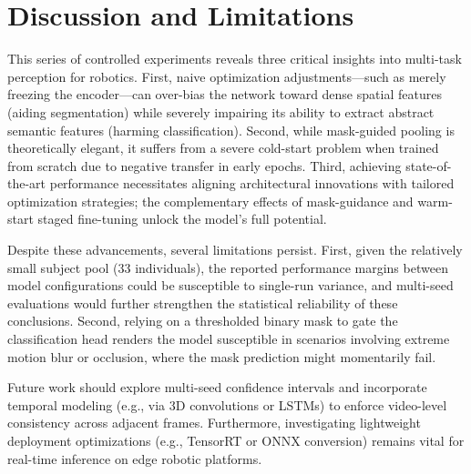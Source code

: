 \documentclass[conference]{IEEEtran}
\begin{document}
\section{Discussion and Limitations}
This series of controlled experiments reveals three critical insights into multi-task perception for robotics. First, naive optimization adjustments—such as merely freezing the encoder—can over-bias the network toward dense spatial features (aiding segmentation) while severely impairing its ability to extract abstract semantic features (harming classification). Second, while mask-guided pooling is theoretically elegant, it suffers from a severe cold-start problem when trained from scratch due to negative transfer in early epochs. Third, achieving state-of-the-art performance necessitates aligning architectural innovations with tailored optimization strategies; the complementary effects of mask-guidance and warm-start staged fine-tuning unlock the model's full potential.

Despite these advancements, several limitations persist. First, given the relatively small subject pool (33 individuals), the reported performance margins between model configurations could be susceptible to single-run variance, and multi-seed evaluations would further strengthen the statistical reliability of these conclusions. Second, relying on a thresholded binary mask to gate the classification head renders the model susceptible in scenarios involving extreme motion blur or occlusion, where the mask prediction might momentarily fail. 

Future work should explore multi-seed confidence intervals and incorporate temporal modeling (e.g., via 3D convolutions or LSTMs) to enforce video-level consistency across adjacent frames. Furthermore, investigating lightweight deployment optimizations (e.g., TensorRT or ONNX conversion) remains vital for real-time inference on edge robotic platforms.
\end{document}
